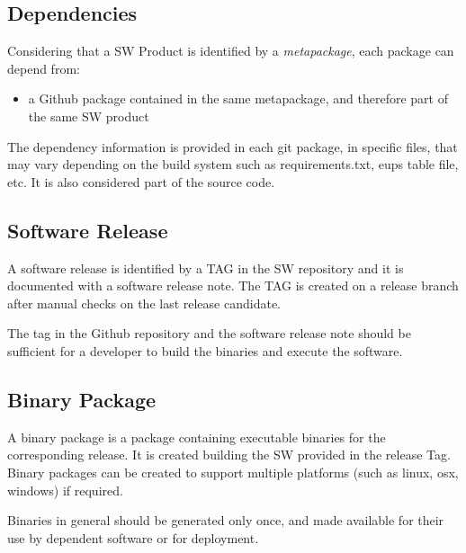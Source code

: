 \subsection{Dependencies} \label{sect:dependencies}

Considering that a SW Product is identified by a \textit{metapackage}, each package can depend from:

\begin{itemize}
\item a Github package contained in the same metapackage, and therefore part of the same SW product
\end{itemize}


The dependency information is provided in each git package, in specific files, that may vary depending on the build system such as requirements.txt, eups table file, etc.
It is also considered part of the source code.


\subsection{Software Release} \label{sect:swrel}

A software release is identified by a TAG in the SW repository and it is documented with a software release note.
The TAG is created on a release branch after manual checks on the last release candidate.

The tag in the Github repository and the software release note should be sufficient for a developer 
to build the binaries and execute the software.



\subsection{Binary Package} \label{sect:swbpkg}

A binary package is a package containing executable binaries for the corresponding release.
It is created building the SW provided in the release Tag. 
Binary packages can be created to support multiple platforms (such as linux, osx, windows) if required.

Binaries in general should be generated only once, and made available for their use by dependent software or for deployment.


